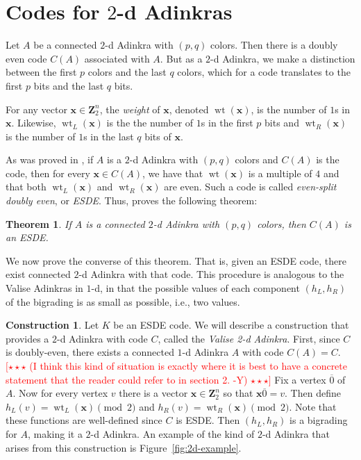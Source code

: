 \documentclass[12pt,twoside,singlespace]{article}
\numberwithin{equation}{section}
\newtheorem{thm}[equation]{Theorem}
\theoremstyle{definition}
\newtheorem{construction}[equation]{Construction}
\newcommand{\ZZ}{\mathbf{Z}}
\newcommand{\on}{\operatorname}
\newcommand{\wt}{\on{wt}}
\newcommand{\com}[1]{\textcolor{red}{$[\star \star \star$ #1 $\star \star \star]$}}
\renewcommand{\vec}[1]{\mathbf{#1}}
\begin{document}
\section{Codes for $2$-d Adinkras}
\label{sec:code2d}
Let $A$ be a connected $2$-d Adinkra with $(p,q)$ colors.  Then there is a doubly even code $C(A)$ associated with $A$.  But as a $2$-d Adinkra, we make a distinction between the first $p$ colors and the last $q$ colors, which for a code translates to the first $p$ bits and the last $q$ bits.

For any vector $\vec{x}\in\ZZ_2^n$, the \emph{weight} of $\vec{x}$, denoted $\wt(\vec{x})$, is the number of $1$s in $\vec{x}$.  Likewise, $\wt_L(\vec{x})$ is the the number of $1$s in the first $p$ bits and $\wt_R(\vec{x})$ is the number of $1$s in the last $q$ bits of $\vec{x}$.

As was proved in \cite{hubsch:weaving}, if $A$ is a $2$-d Adinkra with $(p,q)$ colors and $C(A)$ is the code, then for every $\vec{x}\in C(A)$, we have that $\wt(\vec{x})$ is a multiple of $4$ and that both $\wt_L(\vec{x})$ and $\wt_R(\vec{x})$ are even.  Such a code is called \emph{even-split doubly even}, or \emph{ESDE}.  Thus, \cite{hubsch:weaving} proves the following theorem:
\begin{thm}
\label{thm:esde}
If $A$ is a connected $2$-d Adinkra with $(p,q)$ colors, then $C(A)$ is an ESDE.
\end{thm}

We now prove the converse of this theorem.  That is, given an ESDE code, there exist connected $2$-d Adinkra with that code.  This procedure is analogous to the Valise Adinkras in $1$-d,\cite{d2l:first,d2l:graph-theoretic} in that the possible values of each component $(h_L,h_R)$ of the bigrading is as small as possible, i.e., two values.

\begin{construction}
\label{cons:valise}
Let $K$ be an ESDE code.  We will describe a construction that provides a $2$-d Adinkra with code $C$, called the {\em Valise 2-d Adinkra}. First, since $C$ is doubly-even, there exists a connected $1$-d Adinkra $A$ with code $C(A) = C$. \cite{d2l:omni,d2l:topology} \com{(I think this kind of situation is exactly where it is best to have a concrete statement that the reader could refer to in section 2. -Y)} Fix a vertex $\overline{0}$ of $A$.  Now for every vertex $v$ there is a vector $\vec{x}\in\ZZ_2^n$ so that $\vec{x}\overline{0}=v$.  Then define $h_L(v)=\wt_L(\vec{x})\pmod{2}$ and $h_R(v)=\wt_R(\vec{x})\pmod{2}$.  Note that these functions are well-defined since $C$ is ESDE.  Then $(h_L, h_R)$ is a bigrading for $A$, making it a $2$-d Adinkra.  An example of the kind of $2$-d Adinkra that arises from this construction is Figure~\ref{fig:2d-example}.
\end{construction}
\end{document}
